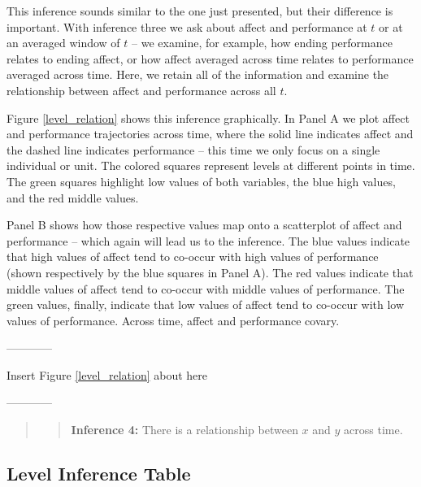\documentclass[english,,man]{apa6}
\theoremstyle{definition}
\theoremstyle{definition}
\theoremstyle{definition}
\theoremstyle{remark}
\begin{document}
This inference sounds similar to the one just presented, but their
difference is important. With inference three we ask about affect and
performance at \(t\) or at an averaged window of \(t\) -- we examine,
for example, how ending performance relates to ending affect, or how
affect averaged across time relates to performance averaged across time.
Here, we retain all of the information and examine the relationship
between affect and performance across all \(t\).

Figure \ref{level_relation} shows this inference graphically. In Panel A
we plot affect and performance trajectories across time, where the solid
line indicates affect and the dashed line indicates performance -- this
time we only focus on a single individual or unit. The colored squares
represent levels at different points in time. The green squares
highlight low values of both variables, the blue high values, and the
red middle values.

Panel B shows how those respective values map onto a scatterplot of
affect and performance -- which again will lead us to the inference. The
blue values indicate that high values of affect tend to co-occur with
high values of performance (shown respectively by the blue squares in
Panel A). The red values indicate that middle values of affect tend to
co-occur with middle values of performance. The green values, finally,
indicate that low values of affect tend to co-occur with low values of
performance. Across time, affect and performance covary.

\begin{center}

------------

Insert Figure \ref{level_relation} about here

------------

\end{center}

\begin{quote}
\begin{quote}
\textbf{Inference 4:} There is a relationship between \(x\) and \(y\)
across time.
\end{quote}
\end{quote}

\hypertarget{level-inference-table}{%
\subsection{Level Inference Table}\label{level-inference-table}}
\end{document}
